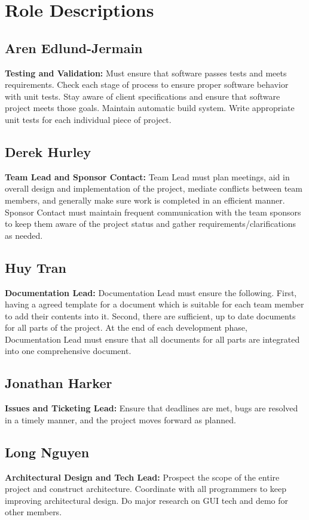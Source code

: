 \documentclass[12pt, letterpaper]{article}
\begin{document}
\section{Role Descriptions}
  \subsection{Aren Edlund-Jermain}
  {\bf Testing and Validation:} Must ensure that software passes tests and meets requirements. Check each stage of process to ensure proper software behavior with unit tests. Stay aware of client specifications and ensure that software project meets those goals. Maintain automatic build system. Write appropriate unit tests for each individual piece of project.
  \subsection{Derek Hurley}
  {\bf Team Lead and Sponsor Contact:} Team Lead must plan meetings, aid in overall design and implementation of the project, mediate conflicts between team members, and generally make sure work is completed in an efficient manner. Sponsor Contact must maintain frequent communication with the team sponsors to keep them aware of the project status and gather requirements/clarifications as needed.
  \subsection{Huy Tran}
  {\bf Documentation Lead:} Documentation Lead must ensure the following. First, having a agreed template for a document which is suitable for each team member to add their contents into it. Second, there are sufficient, up to date documents for all parts of the project. At the end of each development phase, Documentation Lead must ensure that all documents for all parts are integrated into one comprehensive document.
  \subsection{Jonathan Harker}
  {\bf Issues and Ticketing Lead:} Ensure that deadlines are met, bugs are resolved in a timely manner, and the project moves forward as planned.
  \subsection{Long Nguyen}
  {\bf Architectural Design and Tech Lead:} Prospect the scope of the entire project and construct architecture. Coordinate with all programmers to keep improving architectural design. Do major research on GUI tech and demo for other members.
\end{document}
